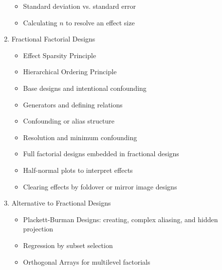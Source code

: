 \documentclass[wide,pal,11pt]{pajarticle}
\begin{document}
\begin{enumerate}
	\begin{itemize}
		\item Standard deviation vs. standard error
		\item Calculating $n$ to resolve an effect size
	\end{itemize}
	\item Fractional Factorial Designs
	\begin{itemize}
		\item Effect Sparsity Principle
		\item Hierarchical Ordering Principle
		\item Base designs and intentional confounding
		\item Generators and defining relations
		\item Confounding or alias structure
		\item Resolution and minimum confounding
		\item Full factorial designs embedded in fractional designs
		\item Half-normal plots to interpret effects
		\item Clearing effects by foldover or mirror image designs
	\end{itemize}
	\item Alternative to Fractional Designs
	\begin{itemize}
		\item Plackett-Burman Designs: creating, complex aliasing, and hidden projection
		\item Regression by subset selection
		\item Orthogonal Arrays for multilevel factorials
	\end{itemize}
\end{enumerate}
\end{document}
